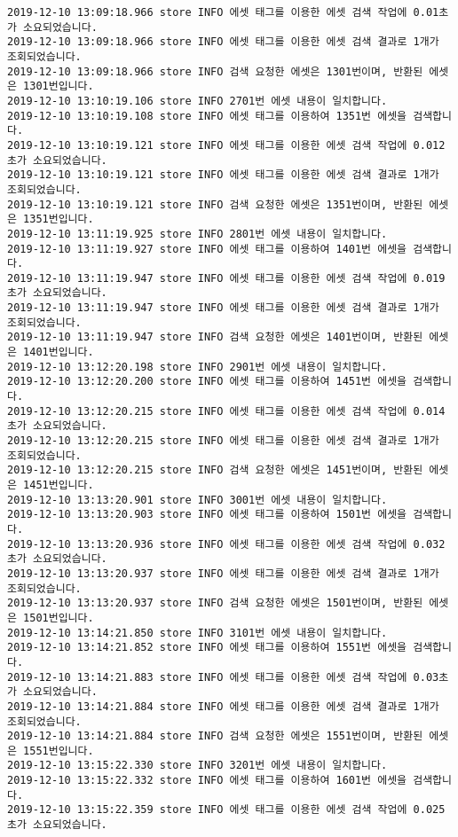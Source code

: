 \begin{Verbatim}[fontsize=\tiny, breaklines=true, breakanywhere=true]
2019-12-10 13:09:18.966 store INFO 에셋 태그를 이용한 에셋 검색 작업에 0.01초가 소요되었습니다.
2019-12-10 13:09:18.966 store INFO 에셋 태그를 이용한 에셋 검색 결과로 1개가 조회되었습니다.
2019-12-10 13:09:18.966 store INFO 검색 요청한 에셋은 1301번이며, 반환된 에셋은 1301번입니다.
2019-12-10 13:10:19.106 store INFO 2701번 에셋 내용이 일치합니다.
2019-12-10 13:10:19.108 store INFO 에셋 태그를 이용하여 1351번 에셋을 검색합니다.
2019-12-10 13:10:19.121 store INFO 에셋 태그를 이용한 에셋 검색 작업에 0.012초가 소요되었습니다.
2019-12-10 13:10:19.121 store INFO 에셋 태그를 이용한 에셋 검색 결과로 1개가 조회되었습니다.
2019-12-10 13:10:19.121 store INFO 검색 요청한 에셋은 1351번이며, 반환된 에셋은 1351번입니다.
2019-12-10 13:11:19.925 store INFO 2801번 에셋 내용이 일치합니다.
2019-12-10 13:11:19.927 store INFO 에셋 태그를 이용하여 1401번 에셋을 검색합니다.
2019-12-10 13:11:19.947 store INFO 에셋 태그를 이용한 에셋 검색 작업에 0.019초가 소요되었습니다.
2019-12-10 13:11:19.947 store INFO 에셋 태그를 이용한 에셋 검색 결과로 1개가 조회되었습니다.
2019-12-10 13:11:19.947 store INFO 검색 요청한 에셋은 1401번이며, 반환된 에셋은 1401번입니다.
2019-12-10 13:12:20.198 store INFO 2901번 에셋 내용이 일치합니다.
2019-12-10 13:12:20.200 store INFO 에셋 태그를 이용하여 1451번 에셋을 검색합니다.
2019-12-10 13:12:20.215 store INFO 에셋 태그를 이용한 에셋 검색 작업에 0.014초가 소요되었습니다.
2019-12-10 13:12:20.215 store INFO 에셋 태그를 이용한 에셋 검색 결과로 1개가 조회되었습니다.
2019-12-10 13:12:20.215 store INFO 검색 요청한 에셋은 1451번이며, 반환된 에셋은 1451번입니다.
2019-12-10 13:13:20.901 store INFO 3001번 에셋 내용이 일치합니다.
2019-12-10 13:13:20.903 store INFO 에셋 태그를 이용하여 1501번 에셋을 검색합니다.
2019-12-10 13:13:20.936 store INFO 에셋 태그를 이용한 에셋 검색 작업에 0.032초가 소요되었습니다.
2019-12-10 13:13:20.937 store INFO 에셋 태그를 이용한 에셋 검색 결과로 1개가 조회되었습니다.
2019-12-10 13:13:20.937 store INFO 검색 요청한 에셋은 1501번이며, 반환된 에셋은 1501번입니다.
2019-12-10 13:14:21.850 store INFO 3101번 에셋 내용이 일치합니다.
2019-12-10 13:14:21.852 store INFO 에셋 태그를 이용하여 1551번 에셋을 검색합니다.
2019-12-10 13:14:21.883 store INFO 에셋 태그를 이용한 에셋 검색 작업에 0.03초가 소요되었습니다.
2019-12-10 13:14:21.884 store INFO 에셋 태그를 이용한 에셋 검색 결과로 1개가 조회되었습니다.
2019-12-10 13:14:21.884 store INFO 검색 요청한 에셋은 1551번이며, 반환된 에셋은 1551번입니다.
2019-12-10 13:15:22.330 store INFO 3201번 에셋 내용이 일치합니다.
2019-12-10 13:15:22.332 store INFO 에셋 태그를 이용하여 1601번 에셋을 검색합니다.
2019-12-10 13:15:22.359 store INFO 에셋 태그를 이용한 에셋 검색 작업에 0.025초가 소요되었습니다.

\end{Verbatim}
